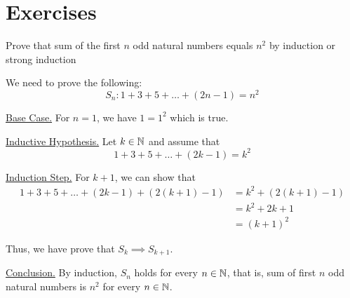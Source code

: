 \section*{Exercises}

\bp Prove that sum of the first $n$ odd natural numbers equals $n^2$ by induction or strong induction \ep

\bs 
We need to prove the following:
$$S_n : 1 + 3 + 5 + \ldots + (2n-1) = n^2$$

\underline{Base Case.} For $n = 1$, we have $1 = 1^2$ which is true.

\underline{Inductive Hypothesis.} Let $k \in \mathbb{N}$ and assume that 
$$1 + 3 + 5 + \ldots + (2k - 1) = k^2$$

\underline{Induction Step.} For $k+1$, we can show that 
\begin{align*}
	1 + 3 + 5 + \ldots + (2k - 1) + (2(k+1) - 1)
		&= k^2 + (2(k+1)-1) \\
		&= k^2 + 2k + 1 \\
		&= (k+1)^2
\end{align*}

Thus, we have prove that $S_k \implies S_{k+1}$.

\underline{Conclusion.} By induction, $S_n$ holds for every $n \in \mathbb{N}$, that is, sum of first $n$ odd natural numbers is $n^2$ for every $n \in \mathbb{N}$.
\es


